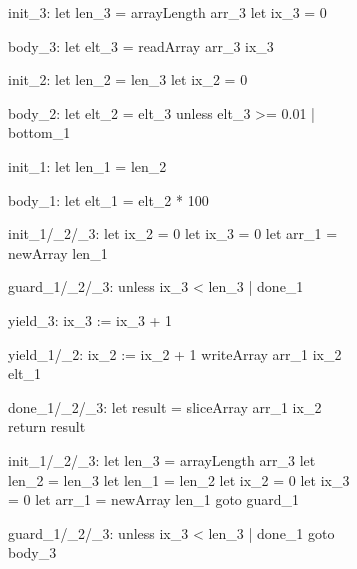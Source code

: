 \documentclass[preamble.tex]{subfiles}
\begin{document}
\providecommand\CommentsColor{\color{MidnightBlue}}
\providecommand\WhatCombinator[1]{\enrule[\CommentsColor]{0.95\textwidth}{#1}}



\begin{figure}
\vspace*{-1cm}
\hspace*{-0.5cm}
\begin{subfigure}{.55\textwidth}
\begin{loopcode}[%
    literate=
        {_1}{{\sub{map}}}3  %
        {_2}{{\sub{filt}}}2 %
        {_3}{{\sub{mfst}}}3 %
]
init_3:
  let len_3 = arrayLength arr_3
  let ix_3 = 0

body_3:
  let elt_3 = readArray arr_3 ix_3


init_2:
  let len_2 = len_3
  let ix_2 = 0

body_2:
  let elt_2 = elt_3
  unless elt_3 >= 0.01 | bottom_1


init_1:
  let len_1 = len_2

body_1:
  let elt_1 = elt_2 * 100


init_1/_2/_3:
  let ix_2 = 0
  let ix_3 = 0
  let arr_1 = newArray len_1

guard_1/_2/_3:
  unless ix_3 < len_3 | done_1

yield_3:
  ix_3 := ix_3 + 1

yield_1/_2:
  ix_2 := ix_2 + 1
  writeArray arr_1 ix_2 elt_1

done_1/_2/_3:
  let result = sliceArray arr_1 ix_2
  return result
\end{loopcode}
\end{subfigure}%
\begin{subfigure}{.55\textwidth}
\begin{loopcode}[%
    literate=
        {_1}{{\sub{map}}}3  %
        {_2}{{\sub{filt}}}2 %
        {_3}{{\sub{mfst}}}3 %
]
init_1/_2/_3:
  let len_3 = arrayLength arr_3
  let len_2 = len_3
  let len_1 = len_2
  let ix_2 = 0
  let ix_3 = 0
  let arr_1 = newArray len_1
  goto guard_1

guard_1/_2/_3:
  unless ix_3 < len_3 | done_1
  goto body_3


\end{loopcode}
\end{subfigure}
\end{figure}
\end{document}
